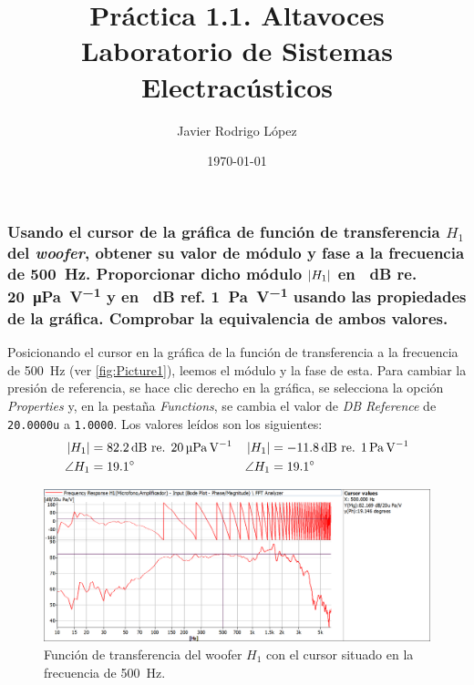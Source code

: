 \documentclass[10pt]{article}
\title{\Huge Práctica 1.1. Altavoces \\\huge Laboratorio de Sistemas Electracústicos}
\author{Javier Rodrigo López}
\date{\today}
\begin{document}
\maketitle

\subsubsection{Usando el cursor de la gráfica de función de transferencia $H_1$ del \textit{woofer}, obtener su valor de módulo y fase a la frecuencia de \SI{500}{\Hz}. Proporcionar dicho módulo $\abs{H_1}$ en \SI{}{\dB} re. \SI{20}{\micro\pascal\per\volt} y en \SI{}{\dB} ref. \SI{1}{\pascal\per\volt} usando las propiedades de la gráfica. Comprobar la equivalencia de ambos valores.}

Posicionando el cursor en la gráfica de la función de transferencia a la frecuencia de \SI{500}{\Hz} (ver \autoref{fig:Picture1}), leemos el módulo y la fase de esta. Para cambiar la presión de referencia, se hace clic derecho en la gráfica, se selecciona la opción \textit{Properties} y, en la pestaña \textit{Functions}, se cambia el valor de \textit{DB Reference} de \verb|20.0000u| a \verb|1.0000|. Los valores leídos son los siguientes:
\begin{align*}
  \abs{H_1}   & = \SI{82.2}{\dB} \text{ re. } \SI{20}{\micro\pascal\per\volt} & \abs{H_1}   & = \SI{-11.8}{\dB} \text{ re. } \SI{1}{\pascal\per\volt} \\
  \angle{H_1} & = \SI{19.1}{\degree}                                          & \angle{H_1} & = \SI{19.1}{\degree}
\end{align*}

\begin{figure}[hbtp]
  \centering
  \includegraphics[width=\linewidth]{Picture1.png}
  \caption{Función de transferencia del woofer $H_1$ con el cursor situado en la frecuencia de \SI{500}{\Hz}.}
  \label{fig:Picture1}
\end{figure}
\end{document}
